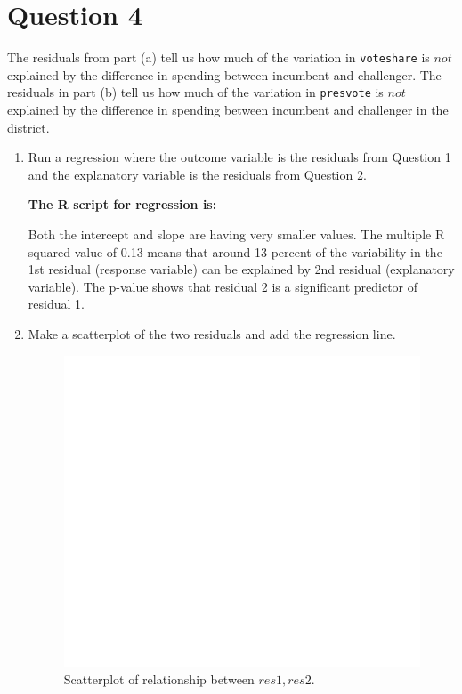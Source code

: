\documentclass[12pt,letterpaper]{article}
\begin{document}
\newpage	

\section*{Question 4}
\noindent The residuals from part (a) tell us how much of the variation in \texttt{voteshare} is $not$ explained by the difference in spending between incumbent and challenger. The residuals in part (b) tell us how much of the variation in \texttt{presvote} is $not$ explained by the difference in spending between incumbent and challenger in the district.
	\begin{enumerate}
		\item Run a regression where the outcome variable is the residuals from Question 1 and the explanatory variable is the residuals from Question 2.
		
		\textbf{		The R script for regression is:}
		 
		
		
		Both the intercept and slope are having very smaller values. The multiple R squared value of 0.13 means that around 13 percent of the variability in the 1st residual (response variable) can be explained by 2nd residual (explanatory variable). The p-value shows that residual 2 is a significant predictor of residual 1.
		
		\item Make a scatterplot of the two residuals and add the regression line. 
		
		
		  
		
		
		\begin{figure}[h!]\centering	\caption{\footnotesize Scatterplot of relationship between $res1, res2$.}	
			
			\includegraphics[width=.7\textwidth]{plot4.pdf}
			

\end{figure}
\end{enumerate}
\end{document}
